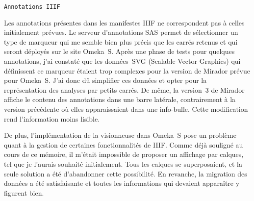 \texttt{Annotations IIIF}\par
Les annotations présentes dans les manifestes IIIF ne correspondent pas à celles initialement prévues. Le serveur d’annotations SAS permet de sélectionner un type de marqueur qui me semble bien plus précis que les carrés retenus et qui seront déployés sur le site Omeka~S. Après une phase de tests pour quelques annotations, j’ai constaté que les données~SVG (Scalable Vector Graphics) qui définissent ce marqueur étaient trop complexes pour la version de Mirador prévue pour Omeka~S. J’ai donc dû simplifier ces données et opter pour la représentation des analyses par petits carrés. De même, la version~3 de Mirador affiche le contenu des annotations dans une barre latérale, contrairement à la version précédente où elles apparaissaient dans une info-bulle. Cette modification rend l’information moins lisible.\par
De plus, l’implémentation de la visionneuse dans Omeka~S pose un problème quant à la gestion de certaines fonctionnalités de IIIF. Comme déjà souligné au cours de ce mémoire, il m’était impossible de proposer un affichage par calques, tel que je l’aurais souhaité initialement. Tous les calques se superposaient, et la seule solution a été d’abandonner cette possibilité. En revanche, la migration des données a été satisfaisante et toutes les informations qui devaient apparaître y figurent bien.